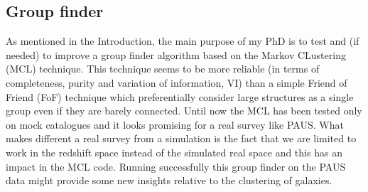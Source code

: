 \documentclass[11pt]{article}
\begin{document}
\subsection{Group finder}
\label{sub:group}
As mentioned in the Introduction, the main purpose of my PhD is to test and (if needed) to improve a group finder algorithm based on the Markov CLustering (MCL) technique. This technique seems to be more reliable (in terms of completeness, purity and variation of information, VI) than a simple Friend of Friend (FoF) technique which preferentially consider large structures as a single group even if they are barely connected. Until now the MCL has been tested only on mock catalogues and it looks promising for a real survey like PAUS. What makes different a real survey from a simulation is the fact that we are limited to work in the redshift space instead of the simulated real space and this has an impact in the MCL code. Running successfully this group finder on the PAUS data might provide some new insights relative to the clustering of galaxies.

















\end{document}
